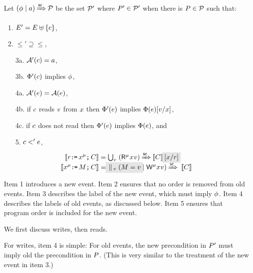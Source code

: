 \begin{candidate}
  \label{def:pre-sc}
Let $(\phi \mid a) \mathbin{{\xRightarrow{{\mathsf{sc}}}}} \mathcal{P}$ be the set $\mathcal{P}'$ where $P'\in\mathcal{P}'$ when
there is $P\in\mathcal{P}$ such that:
\begin{enumerate}
\item\label{pre-E} $E' = E \uplus \{c\}$,
\item\label{pre-le} ${\le'}\supseteq{\le}$, %
\item[3a.] $\mathcal{A}'(c) = a$,
\item[3b.] $\Phi'(c)$ implies $\phi$,
\item[4a.] $\mathcal{A}'(e) = \mathcal{A}(e)$,
\item[4b.] if $c$ \externally reads $v$ from $x$ then
  $\Phi'(e)$ implies $\Phi(e)[v/x]$,
\item[4c.] if $c$ does not \externally read then
  $\Phi'(e)$ implies $\Phi(e)$, and
\item[5.] $c <' e$, 
\end{enumerate}
\vspace{-1ex}
    \begin{align*}
    \sem{\aReg\GETS\aLoc^\amode\SEMI \aCmd} & =
    \smash{\textstyle\bigcup_\aVal\; (\DRmode\aLoc\aVal) \prefixsc \sem{\aCmd}\mkern3.5mu \mathhl{[\aLoc/\aReg] }}
    \\
    \sem{\aLoc^\amode\GETS{\aExp}\SEMI \aCmd} & =
    \smash{\mathhl{\textstyle\PAR_\aVal\; (\aExp=\aVal} \mid \DWmode\aLoc\aVal) \prefixsc\; \sem{\aCmd}}
  \end{align*}
\end{candidate}

Item 1 introduces a new event.  Item 2 ensures that no order is removed from old
events. Item 3 describes the label of the new event, which must imply
$\phi$. Item 4 describes the labels of old events, as discussed below.
Item 5 ensures that program order is included for the new event.

We first discuss writes, then reads.

For writes, item 4 is simple: For old events, the new precondition in $P'$
must imply old the precondition in $P$.  (This is very similar to the
treatment of the new event in item 3.)

